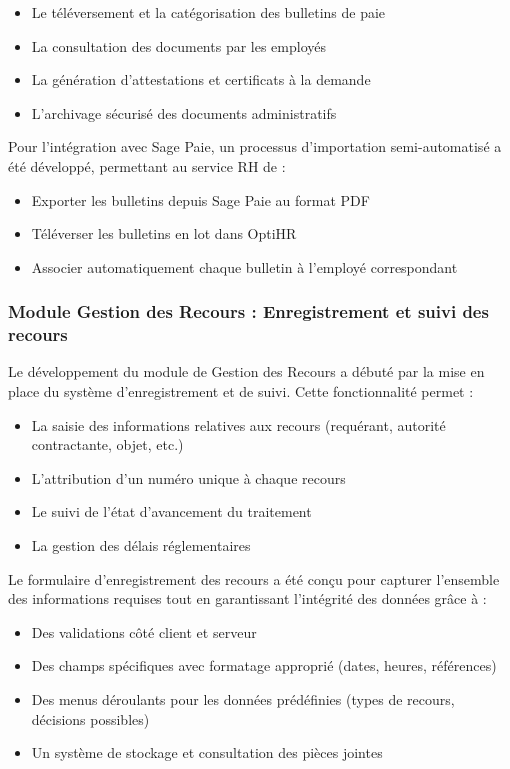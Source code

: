 \begin{itemize}
    \item Le téléversement et la catégorisation des bulletins de paie
    \item La consultation des documents par les employés
    \item La génération d'attestations et certificats à la demande
    \item L'archivage sécurisé des documents administratifs
\end{itemize}

Pour l'intégration avec Sage Paie, un processus d'importation semi-automatisé a été développé, permettant au service RH de :

\begin{itemize}
    \item Exporter les bulletins depuis Sage Paie au format PDF
    \item Téléverser les bulletins en lot dans OptiHR
    \item Associer automatiquement chaque bulletin à l'employé correspondant
\end{itemize}

\subsubsection{Module Gestion des Recours : Enregistrement et suivi des recours}
Le développement du module de Gestion des Recours a débuté par la mise en place du système d'enregistrement et de suivi. Cette fonctionnalité permet :

\begin{itemize}
    \item La saisie des informations relatives aux recours (requérant, autorité contractante, objet, etc.)
    \item L'attribution d'un numéro unique à chaque recours
    \item Le suivi de l'état d'avancement du traitement
    \item La gestion des délais réglementaires
\end{itemize}

Le formulaire d'enregistrement des recours a été conçu pour capturer l'ensemble des informations requises tout en garantissant l'intégrité des données grâce à :

\begin{itemize}
    \item Des validations côté client et serveur
    \item Des champs spécifiques avec formatage approprié (dates, heures, références)
    \item Des menus déroulants pour les données prédéfinies (types de recours, décisions possibles)
    \item Un système de stockage et consultation des pièces jointes
\end{itemize}

